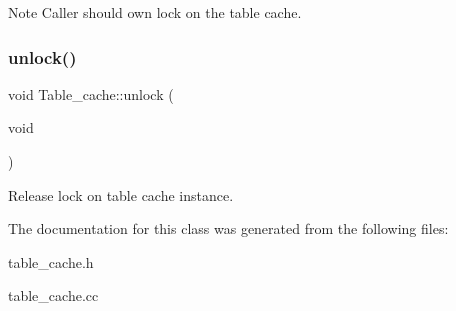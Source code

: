 \begin{DoxyNote}{Note}
Caller should own lock on the table cache. 
\end{DoxyNote}
\mbox{\label{classTable__cache_a101b725dc04235f5be210378363a816c}} 
\subsubsection{\texorpdfstring{unlock()}{unlock()}}
{\footnotesize\ttfamily void Table\+\_\+cache\+::unlock (\begin{DoxyParamCaption}\item[{void}]{ }\end{DoxyParamCaption})\hspace{0.3cm}{\ttfamily [inline]}}

Release lock on table cache instance. 

The documentation for this class was generated from the following files\+:\begin{DoxyCompactItemize}
\item 
table\+\_\+cache.\+h\item 
table\+\_\+cache.\+cc\end{DoxyCompactItemize}
